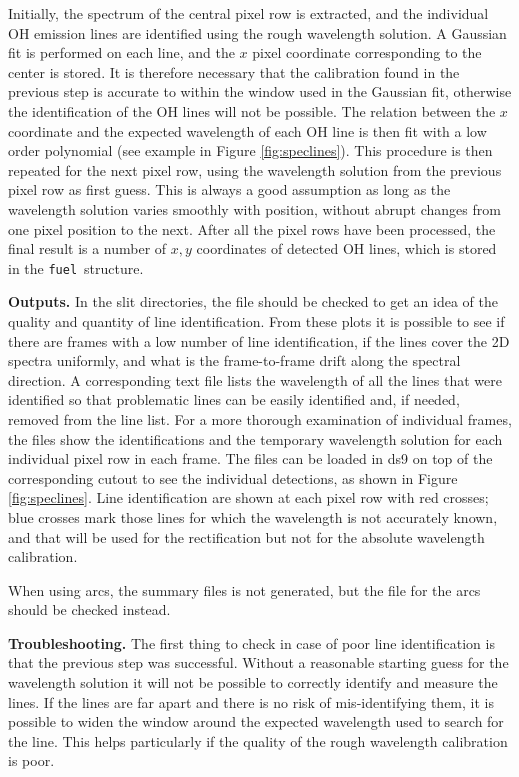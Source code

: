 \documentclass[a4paper]{article}
\newcommand{\fuel}{\texttt{fuel}}
\begin{document}
\begin{sloppypar}
Initially, the spectrum of the central pixel row is extracted, and the individual OH emission lines are identified using the rough wavelength solution. A Gaussian fit is performed on each line, and the $x$ pixel coordinate corresponding to the center is stored. It is therefore necessary that the calibration found in the previous step is accurate to within the window used in the Gaussian fit, otherwise the identification of the OH lines will not be possible. The relation between the $x$ coordinate and the expected wavelength of each OH line is then fit with a low order polynomial (see example in Figure \ref{fig:speclines}). This procedure is then repeated for the next pixel row, using the wavelength solution from the previous pixel row as first guess. This is always a good assumption as long as the wavelength solution varies smoothly with position, without abrupt changes from one pixel position to the next. After all the pixel rows have been processed, the final result is a number of $x,y$ coordinates of detected OH lines, which is stored in the \fuel\ structure.

\medskip
\noindent
\textbf{Outputs.} In the slit directories, the file  should be checked to get an idea of the quality and quantity of line identification. From these plots it is possible to see if there are frames with a low number of line identification, if the lines cover the 2D spectra uniformly, and what is the frame-to-frame drift along the spectral direction. A corresponding text file lists the wavelength of all the lines that were identified so that problematic lines can be easily identified and, if needed, removed from the line list. For a more thorough examination of individual frames, the  files show the identifications and the temporary wavelength solution for each individual pixel row in each frame. The  files can be loaded in ds9 on top of the corresponding cutout to see the individual detections, as shown in Figure \ref{fig:speclines}. Line identification are shown at each pixel row with red crosses; blue crosses mark those lines for which the wavelength is not accurately known, and that will be used for the rectification but not for the absolute wavelength calibration.

When using arcs, the summary files is not generated, but the  file for the arcs should be checked instead.

\medskip
\noindent
\textbf{Troubleshooting.} The first thing to check in case of poor line identification is that the previous step was successful. Without a reasonable starting guess for the wavelength solution it will not be possible to correctly identify and measure the lines. If the lines are far apart and there is no risk of mis-identifying them, it is possible to widen the window around the expected wavelength used to search for the line. This helps particularly if the quality of the rough wavelength calibration is poor.


\end{sloppypar}
\end{document}
